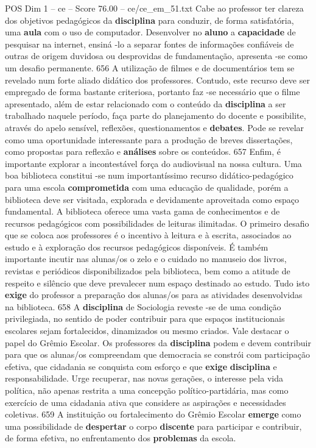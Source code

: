 \begin{textsample}{POS Dim 1 – ce – Score 76.00 – ce/ce\_em\_51.txt}
Cabe ao professor ter clareza dos objetivos pedagógicos da \textbf{disciplina} para conduzir, de forma satisfatória, uma \textbf{aula} com o uso de computador.
Desenvolver no \textbf{aluno} a \textbf{capacidade} de pesquisar na internet, ensiná -lo a separar fontes de informações confiáveis de outras de origem duvidosa ou desprovidas de fundamentação, apresenta -se como um desafio permanente. 656 A utilização de filmes e de documentários tem se revelado num forte aliado didático dos professores.
Contudo, este recurso deve ser empregado de forma bastante criteriosa, portanto faz -se necessário que o filme apresentado, além de estar relacionado com o conteúdo da \textbf{disciplina} a ser trabalhado naquele período, faça parte do planejamento do docente e possibilite, através do apelo sensível, reflexões, questionamentos e \textbf{debates}.
Pode se revelar como uma oportunidade interessante para a produção de breves dissertações, como propostas para reflexão e \textbf{análises} sobre os conteúdos. 657 Enfim, é importante explorar a incontestável força do audiovisual na nossa cultura.
Uma boa biblioteca constitui -se num importantíssimo recurso didático-pedagógico para uma escola \textbf{comprometida} com uma educação de qualidade, porém a biblioteca deve ser visitada, explorada e devidamente aproveitada como espaço fundamental.
A biblioteca oferece uma vasta gama de conhecimentos e de recursos pedagógicos com possibilidades de leituras ilimitadas.
O primeiro desafio que se coloca aos professores é o incentivo à leitura e à escrita, associados ao estudo e à exploração dos recursos pedagógicos disponíveis.
É também importante incutir nas alunas/os o zelo e o cuidado no manuseio dos livros, revistas e periódicos disponibilizados pela biblioteca, bem como a atitude de respeito e silêncio que deve prevalecer num espaço destinado ao estudo.
Tudo isto \textbf{exige} do professor a preparação dos alunas/os para as atividades desenvolvidas na biblioteca. 658 A \textbf{disciplina} de Sociologia reveste -se de uma condição privilegiada, no sentido de poder contribuir para que espaços institucionais escolares sejam fortalecidos, dinamizados ou mesmo criados.
Vale destacar o papel do Grêmio Escolar.
Os professores da \textbf{disciplina} podem e devem contribuir para que os alunas/os compreendam que democracia se constrói com participação efetiva, que cidadania se conquista com esforço e que \textbf{exige} \textbf{disciplina} e responsabilidade.
Urge recuperar, nas novas gerações, o interesse pela vida política, não apenas restrita a uma concepção político-partidária, mas como exercício de uma cidadania ativa que considere as aspirações e necessidades coletivas. 659 A instituição ou fortalecimento do Grêmio Escolar \textbf{emerge} como uma possibilidade de \textbf{despertar} o corpo \textbf{discente} para participar e contribuir, de forma efetiva, no enfrentamento dos \textbf{problemas} da escola.

\end{textsample}
